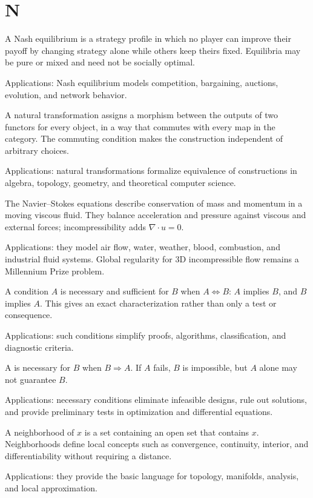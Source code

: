 \chapter*{N}
\label{chap:n}

A Nash equilibrium is a strategy profile in which no player can improve their payoff by changing strategy alone while others keep theirs fixed. Equilibria may be pure or mixed and need not be socially optimal. \par\noindent Applications: Nash equilibrium models competition, bargaining, auctions, evolution, and network behavior.

A natural transformation assigns a morphism between the outputs of two functors for every object, in a way that commutes with every map in the category. The commuting condition makes the construction independent of arbitrary choices. \par\noindent Applications: natural transformations formalize equivalence of constructions in algebra, topology, geometry, and theoretical computer science.

The Navier--Stokes equations describe conservation of mass and momentum in a moving viscous fluid. They balance acceleration and pressure against viscous and external forces; incompressibility adds $\nabla\cdot u=0$. \par\noindent Applications: they model air flow, water, weather, blood, combustion, and industrial fluid systems. Global regularity for 3D incompressible flow remains a Millennium Prize problem.

A condition $A$ is necessary and sufficient for $B$ when $A\iff B$: $A$ implies $B$, and $B$ implies $A$. This gives an exact characterization rather than only a test or consequence. \par\noindent Applications: such conditions simplify proofs, algorithms, classification, and diagnostic criteria.

A is necessary for $B$ when $B\Rightarrow A$. If $A$ fails, $B$ is impossible, but $A$ alone may not guarantee $B$. \par\noindent Applications: necessary conditions eliminate infeasible designs, rule out solutions, and provide preliminary tests in optimization and differential equations.

A neighborhood of $x$ is a set containing an open set that contains $x$. Neighborhoods define local concepts such as convergence, continuity, interior, and differentiability without requiring a distance. \par\noindent Applications: they provide the basic language for topology, manifolds, analysis, and local approximation.

